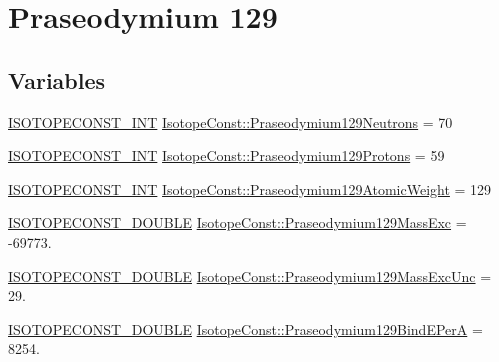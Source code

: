 \hypertarget{group___isotope_const-_praseodymium-_pr129}{}\section{Praseodymium 129}
\label{group___isotope_const-_praseodymium-_pr129}
\subsection*{Variables}
\begin{DoxyCompactItemize}
\item 
\mbox{\hyperlink{group___isotope_const-_macros_ga5f18360b3e99483a35c32d789e62621c}{I\+S\+O\+T\+O\+P\+E\+C\+O\+N\+S\+T\+\_\+\+I\+NT}} \mbox{\hyperlink{group___isotope_const-_praseodymium-_pr129_ga1844a6786916ef69ed3b518ed0ea49c7}{Isotope\+Const\+::\+Praseodymium129\+Neutrons}} = 70
\item 
\mbox{\hyperlink{group___isotope_const-_macros_ga5f18360b3e99483a35c32d789e62621c}{I\+S\+O\+T\+O\+P\+E\+C\+O\+N\+S\+T\+\_\+\+I\+NT}} \mbox{\hyperlink{group___isotope_const-_praseodymium-_pr129_ga3b757f3b01ae5c8d3f59327268e50532}{Isotope\+Const\+::\+Praseodymium129\+Protons}} = 59
\item 
\mbox{\hyperlink{group___isotope_const-_macros_ga5f18360b3e99483a35c32d789e62621c}{I\+S\+O\+T\+O\+P\+E\+C\+O\+N\+S\+T\+\_\+\+I\+NT}} \mbox{\hyperlink{group___isotope_const-_praseodymium-_pr129_ga9a5cc9fca105d4bf21ffa0e6c53e3d96}{Isotope\+Const\+::\+Praseodymium129\+Atomic\+Weight}} = 129
\item 
\mbox{\hyperlink{group___isotope_const-_macros_ga8f45a7272ce02c0b4c65c44636ed719a}{I\+S\+O\+T\+O\+P\+E\+C\+O\+N\+S\+T\+\_\+\+D\+O\+U\+B\+LE}} \mbox{\hyperlink{group___isotope_const-_praseodymium-_pr129_gaf398c78a06831234ea2d2b014be75fe1}{Isotope\+Const\+::\+Praseodymium129\+Mass\+Exc}} = -\/69773.
\item 
\mbox{\hyperlink{group___isotope_const-_macros_ga8f45a7272ce02c0b4c65c44636ed719a}{I\+S\+O\+T\+O\+P\+E\+C\+O\+N\+S\+T\+\_\+\+D\+O\+U\+B\+LE}} \mbox{\hyperlink{group___isotope_const-_praseodymium-_pr129_ga3c020c176d54ed8c78d8c996d40be03a}{Isotope\+Const\+::\+Praseodymium129\+Mass\+Exc\+Unc}} = 29.
\item 
\mbox{\hyperlink{group___isotope_const-_macros_ga8f45a7272ce02c0b4c65c44636ed719a}{I\+S\+O\+T\+O\+P\+E\+C\+O\+N\+S\+T\+\_\+\+D\+O\+U\+B\+LE}} \mbox{\hyperlink{group___isotope_const-_praseodymium-_pr129_ga0c3eb8016b5f22ca69f8215cad008294}{Isotope\+Const\+::\+Praseodymium129\+Bind\+E\+PerA}} = 8254.

\end{DoxyCompactItemize}
